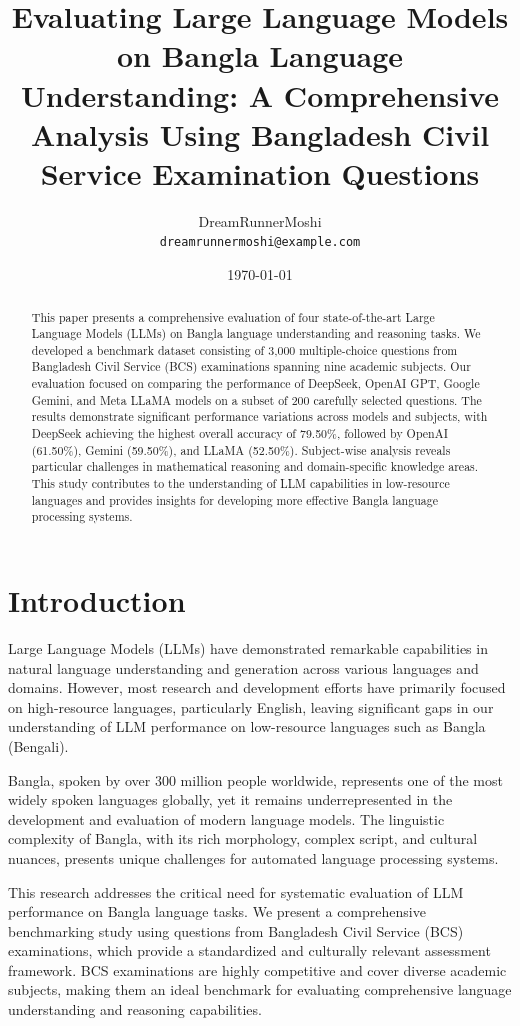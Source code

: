 \documentclass[11pt,a4paper]{article}
\title{Evaluating Large Language Models on Bangla Language Understanding: A Comprehensive Analysis Using Bangladesh Civil Service Examination Questions}
\author{
    DreamRunnerMoshi\\
    \texttt{dreamrunnermoshi@example.com}
}
\date{\today}
\begin{document}
\maketitle

\begin{abstract}
This paper presents a comprehensive evaluation of four state-of-the-art Large Language Models (LLMs) on Bangla language understanding and reasoning tasks. We developed a benchmark dataset consisting of 3,000 multiple-choice questions from Bangladesh Civil Service (BCS) examinations spanning nine academic subjects. Our evaluation focused on comparing the performance of DeepSeek, OpenAI GPT, Google Gemini, and Meta LLaMA models on a subset of 200 carefully selected questions. The results demonstrate significant performance variations across models and subjects, with DeepSeek achieving the highest overall accuracy of 79.50\%, followed by OpenAI (61.50\%), Gemini (59.50\%), and LLaMA (52.50\%). Subject-wise analysis reveals particular challenges in mathematical reasoning and domain-specific knowledge areas. This study contributes to the understanding of LLM capabilities in low-resource languages and provides insights for developing more effective Bangla language processing systems.
\end{abstract}

\section{Introduction}

Large Language Models (LLMs) have demonstrated remarkable capabilities in natural language understanding and generation across various languages and domains. However, most research and development efforts have primarily focused on high-resource languages, particularly English, leaving significant gaps in our understanding of LLM performance on low-resource languages such as Bangla (Bengali).

Bangla, spoken by over 300 million people worldwide, represents one of the most widely spoken languages globally, yet it remains underrepresented in the development and evaluation of modern language models. The linguistic complexity of Bangla, with its rich morphology, complex script, and cultural nuances, presents unique challenges for automated language processing systems.

This research addresses the critical need for systematic evaluation of LLM performance on Bangla language tasks. We present a comprehensive benchmarking study using questions from Bangladesh Civil Service (BCS) examinations, which provide a standardized and culturally relevant assessment framework. BCS examinations are highly competitive and cover diverse academic subjects, making them an ideal benchmark for evaluating comprehensive language understanding and reasoning capabilities.
\end{document}
